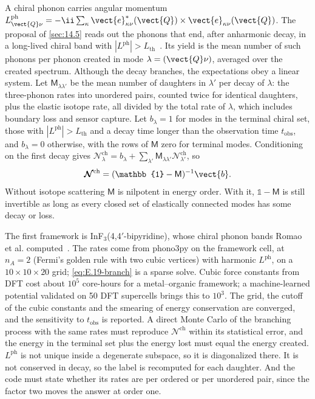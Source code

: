 A chiral phonon carries angular momentum $L^{\mathrm{ph}}_{\vect{Q}\nu} = -\ii\sum_\kappa\vect{e}^*_{\kappa\nu}(\vect{Q})\times\vect{e}_{\kappa\nu}(\vect{Q})$. The proposal of \cref{sec:14.5} reads out the phonons that end, after anharmonic decay, in a long-lived chiral band with $|L^{\mathrm{ph}}| > L_{\mathrm{th}}$~\cite{romao2023chiral}. Its yield is the mean number of such phonons per phonon created in mode $\lambda = (\vect{Q}\nu)$, averaged over the created spectrum. Although the decay branches, the expectations obey a linear system. Let $\mathsf{M}_{\lambda\lambda'}$ be the mean number of daughters in $\lambda'$ per decay of $\lambda$: the three-phonon rates into unordered pairs, counted twice for identical daughters, plus the elastic isotope rate, all divided by the total rate of $\lambda$, which includes boundary loss and sensor capture. Let $b_\lambda = 1$ for modes in the terminal chiral set, those with $|L^{\mathrm{ph}}| > L_{\mathrm{th}}$ and a decay time longer than the observation time $t_{\mathrm{obs}}$, and $b_\lambda = 0$ otherwise, with the rows of $\mathsf{M}$ zero for terminal modes. Conditioning on the first decay gives $\mathcal{N}^{\mathrm{ch}}_\lambda = b_\lambda + \sum_{\lambda'}\mathsf{M}_{\lambda\lambda'}\mathcal{N}^{\mathrm{ch}}_{\lambda'}$, so
\begin{equation}
  \boldsymbol{\mathcal{N}}^{\mathrm{ch}} = (\mathbb{1} - \mathsf{M})^{-1}\vect{b} .
  \label{eq:E.19-branch}
\end{equation}
Without isotope scattering $\mathsf{M}$ is nilpotent in energy order. With it, $\mathbb{1} - \mathsf{M}$ is still invertible as long as every closed set of elastically connected modes has some decay or loss.

The first framework is InF$_3$(4,4$'$-bipyridine), whose chiral phonon bands Romao et al. computed~\cite{romao2023chiral}. The rates come from phono3py on the framework cell, at $n_A = 2$ (Fermi's golden rule with two cubic vertices) with harmonic $L^{\mathrm{ph}}$, on a $10\times10\times20$ grid; \cref{eq:E.19-branch} is a sparse solve. Cubic force constants from DFT cost about $10^5$ core-hours for a metal--organic framework; a machine-learned potential validated on 50 DFT supercells brings this to $10^3$. The grid, the cutoff of the cubic constants and the smearing of energy conservation are converged, and the sensitivity to $t_{\mathrm{obs}}$ is reported. A direct Monte Carlo of the branching process with the same rates must reproduce $\boldsymbol{\mathcal{N}}^{\mathrm{ch}}$ within its statistical error, and the energy in the terminal set plus the energy lost must equal the energy created. $L^{\mathrm{ph}}$ is not unique inside a degenerate subspace, so it is diagonalized there. It is not conserved in decay, so the label is recomputed for each daughter. And the code must state whether its rates are per ordered or per unordered pair, since the factor two moves the answer at order one.

